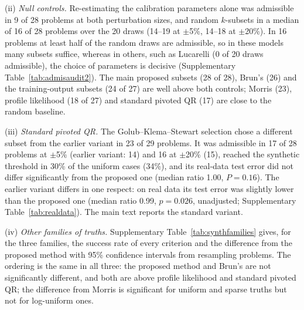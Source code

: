 (ii) \emph{Null controls.} Re-estimating the calibration parameters alone was admissible in 9 of 28 problems at both perturbation sizes, and random $k$-subsets in a median of 16 of 28 problems over the 20 draws (14--19 at $\pm$5\%, 14--18 at $\pm$20\%). In 16 problems at least half of the random draws are admissible, so in these models many subsets suffice, whereas in others, such as Lucarelli (0 of 20 draws admissible), the choice of parameters is decisive (Supplementary Table~\ref{tab:admisaudit2}). The main proposed subsets (28 of 28), Brun's (26) and the training-output subsets (24 of 27) are well above both controls; Morris (23), profile likelihood (18 of 27) and standard pivoted QR (17) are close to the random baseline.

(iii) \emph{Standard pivoted QR.} The Golub--Klema--Stewart selection chose a different subset from the earlier variant in 23 of 29 problems. It was admissible in 17 of 28 problems at $\pm$5\% (earlier variant: 14) and 16 at $\pm$20\% (15), reached the synthetic threshold in 30\% of the uniform cases (34\%), and its real-data test error did not differ significantly from the proposed one (median ratio 1.00, $P=0.16$). The earlier variant differs in one respect: on real data its test error was slightly lower than the proposed one (median ratio 0.99, $p=0.026$, unadjusted; Supplementary Table~\ref{tab:realdata}). The main text reports the standard variant.

(iv) \emph{Other families of truths.} Supplementary Table~\ref{tab:synthfamilies} gives, for the three families, the success rate of every criterion and the difference from the proposed method with 95\% confidence intervals from resampling problems. The ordering is the same in all three: the proposed method and Brun's are not significantly different, and both are above profile likelihood and standard pivoted QR; the difference from Morris is significant for uniform and sparse truths but not for log-uniform ones.



\begin{table}[ht]
\centering\scriptsize
\caption{\textbf{Synthetic prediction for three families of truths.} Fraction of the cases with signal (common to all criteria of each block) in which $e_{\mathrm{pred}}\le\tau_e$; difference between the reference and each criterion in percentage points, with a 95\% confidence interval from resampling whole problems (10,000 replicates) and the Holm-adjusted two-sided $P$ over the four existing criteria (the earlier QR variant and the comparison between the two proposed selections are unadjusted). Uniform: $\theta^\ast=\theta_0(1+0.2u)$, 20 seeds; log-uniform: $\theta^\ast_j=\theta_{0,j}10^{v_j}$ with $v_j$ uniform in $[-0.3,0.3]$, ten seeds; sparse: 15\% of the estimable parameters changed by $\pm$50\%, ten seeds.}\label{tab:synthfamilies}

\end{table}

